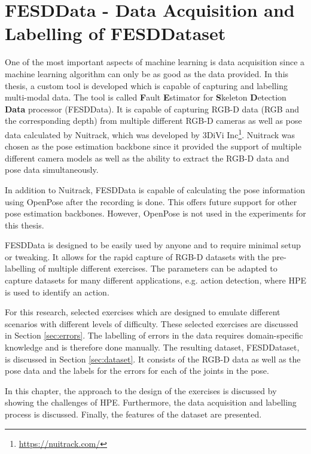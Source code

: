 \chapter[FESDData]{FESDData - Data Acquisition and Labelling of FESDDataset}
\label{sec:data_processing}

One of the most important aspects of machine learning is data acquisition since a machine learning algorithm can only be as good as the data provided. In this thesis, a custom tool is developed which is capable of capturing and labelling multi-modal data. The tool is called \textbf{F}ault \textbf{E}stimator for \textbf{S}keleton \textbf{D}etection \textbf{Data} processor (FESDData). It is capable of capturing RGB-D data (RGB and the corresponding depth) from multiple different RGB-D cameras as well as pose data calculated by Nuitrack, which was developed by 3DiVi Inc\footnote{\url{https://nuitrack.com/}}. Nuitrack was chosen as the pose estimation backbone since it provided the support of multiple different camera models as well as the ability to extract the RGB-D data and pose data simultaneously.

In addition to Nuitrack, FESDData is capable of calculating the pose information using OpenPose after the recording is done. This offers future support for other pose estimation backbones. However, OpenPose is not used in the experiments for this thesis.

FESDData is designed to be easily used by anyone and to require minimal setup or tweaking. It allows for the rapid capture of RGB-D datasets with the pre-labelling of multiple different exercises. The parameters can be adapted to capture datasets for many different applications, e.g. action detection, where HPE is used to identify an action. 

For this research, selected exercises which are designed to emulate different scenarios with different levels of difficulty. These selected exercises are discussed in Section \ref{sec:errors}. The labelling of errors in the data requires domain-specific knowledge and is therefore done manually. The resulting dataset, FESDDataset, is discussed in Section \ref{sec:dataset}. It consists of the RGB-D data as well as the pose data and the labels for the errors for each of the joints in the pose.

In this chapter, the approach to the design of the exercises is discussed by showing the challenges of HPE. Furthermore, the data acquisition and labelling process is discussed. Finally, the features of the dataset are presented.







